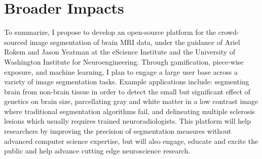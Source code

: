 \section*{Broader Impacts}

To summarize, I propose to develop an open-source platform for the crowd-sourced image segmentation of brain MRI data, under the guidance of Ariel Rokem and Jason Yeatman at the eScience Institute and the University of Washington Institute for Neuroengineering. Through gamification, piece-wise exposure, and machine learning, I plan to engage a large user base across a variety of image segmentation tasks. Example applications include: segmenting brain from non-brain tissue in order to detect the small but significant effect of genetics on brain size, parcellating gray and white matter in a low contrast image where traditional segmentation algorithms fail, and delineating multiple sclerosis lesions which usually requires trained neuroradiologists. This platform will help researchers by improving the precision of segmentation measures without advanced computer science expertise, but will also engage, educate and excite the public and help advance cutting edge neuroscience research. 
